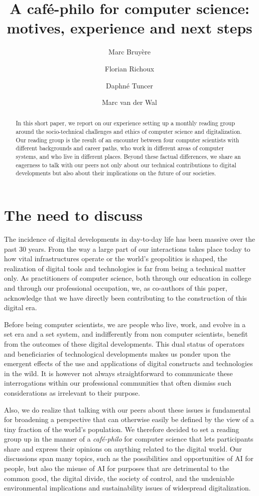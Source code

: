 \documentclass[journal]{IEEEtran}
\title{A café-philo for computer science:\\motives, experience and next steps}
\date{}
\author[1,3]{Marc Bruyère}
\author[2,3]{Florian Richoux}
\author[4]{Daphné Tuncer}
\author[5]{Marc van der Wal}
\affil[   ]{\it   marc@iij.ad.jp    \quad   florian@richoux.fr   \quad
  daphne.tuncer@enpc.fr \quad marc.vanderwal@afnic.fr}
\affil[1]{IIJ Research Lab, Japan}
\affil[2]{AIST, Japan}
\affil[3]{JFLI, CNRS, Japan}
\affil[4]{École des Ponts ParisTech, France}
\affil[5]{Afnic, France}
\begin{document}
\maketitle

\begin{abstract}
  In  this short  paper,  we report  on our  experience  setting up  a
  monthly  reading group  around  the  socio-technical challenges  and
  ethics of computer science and  digitalization. Our reading group is
  the result  of an  encounter between  four computer  scientists with
  different backgrounds and career paths,  who work in different areas
  of computer systems, and who  live in different places. Beyond these
  factual differences,  we share an  eagerness to talk with  our peers
  not only  about our technical contributions  to digital developments
  but also about their implications on the future of our societies.
\end{abstract}

\section{The need to discuss}

The  incidence of  digital developments  in day-to-day  life has  been
massive over  the past  30 years.  From the  way a  large part  of our
interactions  takes  place  today  to how vital  infrastructures
operate or the  world’s geopolitics is shaped, the realization
of digital tools and technologies is far from being a technical matter
only. As practitioners of computer science, both through our education
in college and through our  professional occupation, we, as co-authors
of this paper, acknowledge that  we have directly been contributing to
the construction of this digital era.

Before being computer scientists, we are people who live, work, and evolve in
a set era and a set system, and indifferently from non computer scientists,
benefit from the outcomes of these digital developments. This dual status of
operators and beneficiaries of technological developments makes us ponder upon
the emergent effects of the use and applications of digital constructs and
technologies in the wild. It is however not always straightforward to
communicate these interrogations within our professional communities that
often dismiss such considerations as irrelevant to their purpose.

Also, we do realize that talking with our peers about these issues
is fundamental for broadening a perspective that can otherwise easily be
defined  by  the  view  of   a tiny fraction   of  the  world’s
population. We  therefore decided  to set  a reading  group up  in the
manner of  a \textit{café-philo}  for computer  science that  lets participants
share and  express their  opinions on anything  related to  the digital
world. Our discussions span many topics, such as the possibilities and
opportunities of AI for people, but also the misuse of AI
for purposes that are detrimental to the common good, the digital divide, the
society of control, and the undeniable environmental implications and
sustainability issues of widespread digitalization.
\end{document}
